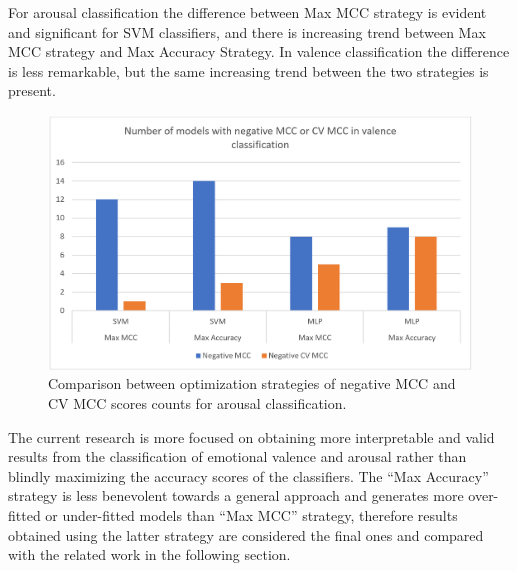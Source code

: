 For arousal classification the difference between Max MCC strategy is evident and significant for \ac{SVM} classifiers, and there is increasing trend between Max MCC strategy and Max Accuracy Strategy. In valence classification the difference is less remarkable, but the same increasing trend between the two strategies is present.

\begin{figure}[h!]
\includegraphics[width=12cm]{img/results/valence_strategy_comparison.png}
\centering
\caption{Comparison between optimization strategies of negative MCC and CV MCC scores counts for arousal classification.} \label{fig:valence_strategy_comparison}
\end{figure}

The current research is more focused on obtaining more interpretable and valid results from the classification of emotional valence and arousal rather than blindly maximizing the accuracy scores of the classifiers. The “Max Accuracy” strategy is less benevolent towards a general approach and generates more over-fitted or under-fitted models than “Max MCC” strategy, therefore results obtained using the latter strategy are considered the final ones and compared with the related work in the following section.

